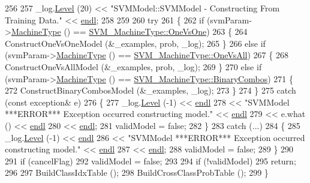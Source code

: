 \begin{DoxyCode}
256 
257   \_log.\hyperlink{class_k_k_b_1_1_run_log_a32cf761d7f2e747465fd80533fdbb659}{Level} (20) << \textcolor{stringliteral}{"SVMModel::SVMModel - Constructing From Training Data."} << 
      \hyperlink{namespace_k_k_b_ad1f50f65af6adc8fa9e6f62d007818a8}{endl};
258 
259 
260   \textcolor{keywordflow}{try}
261   \{
262     \textcolor{keywordflow}{if}  (svmParam->\hyperlink{class_k_k_m_l_l_1_1_s_v_mparam_a30153e00007f9cf65343e0ad97ad61fb}{MachineType} () == \hyperlink{namespace_k_k_m_l_l_ad917464bc631109a3021cf02cd27af9aa2cb1a8e8122853731a8eb99f1bd56630}{SVM\_MachineType::OneVsOne})
263     \{
264       ConstructOneVsOneModel (&\_examples, prob, \_log);
265     \}
266     \textcolor{keywordflow}{else} \textcolor{keywordflow}{if}  (svmParam->\hyperlink{class_k_k_m_l_l_1_1_s_v_mparam_a30153e00007f9cf65343e0ad97ad61fb}{MachineType} () == \hyperlink{namespace_k_k_m_l_l_ad917464bc631109a3021cf02cd27af9aa0bf7132f9ec5b2de535b831afd3ae75c}{SVM\_MachineType::OneVsAll})
267     \{
268       ConstructOneVsAllModel (&\_examples, prob, \_log);
269     \}
270     \textcolor{keywordflow}{else} \textcolor{keywordflow}{if}  (svmParam->\hyperlink{class_k_k_m_l_l_1_1_s_v_mparam_a30153e00007f9cf65343e0ad97ad61fb}{MachineType} () == 
      \hyperlink{namespace_k_k_m_l_l_ad917464bc631109a3021cf02cd27af9aa01ad67463554c5f5552dcc6b5f4a553f}{SVM\_MachineType::BinaryCombos})
271     \{
272       ConstructBinaryCombosModel (&\_examples, \_log);
273     \}
274   \}
275   \textcolor{keywordflow}{catch}  (\textcolor{keyword}{const} exception& e)
276   \{
277     \_log.\hyperlink{class_k_k_b_1_1_run_log_a32cf761d7f2e747465fd80533fdbb659}{Level} (-1) << \hyperlink{namespace_k_k_b_ad1f50f65af6adc8fa9e6f62d007818a8}{endl}
278       << \textcolor{stringliteral}{"SVMModel  ***ERROR***   Exception occurred constructing model."} << 
      \hyperlink{namespace_k_k_b_ad1f50f65af6adc8fa9e6f62d007818a8}{endl}
279       << e.what () << \hyperlink{namespace_k_k_b_ad1f50f65af6adc8fa9e6f62d007818a8}{endl}
280       << \hyperlink{namespace_k_k_b_ad1f50f65af6adc8fa9e6f62d007818a8}{endl};
281     validModel = \textcolor{keyword}{false};
282   \}
283   \textcolor{keywordflow}{catch}  (...)
284   \{
285     \_log.\hyperlink{class_k_k_b_1_1_run_log_a32cf761d7f2e747465fd80533fdbb659}{Level} (-1) << \hyperlink{namespace_k_k_b_ad1f50f65af6adc8fa9e6f62d007818a8}{endl}
286       << \textcolor{stringliteral}{"SVMModel  ***ERROR***   Exception occurred constructing model."} << 
      \hyperlink{namespace_k_k_b_ad1f50f65af6adc8fa9e6f62d007818a8}{endl}
287       << \hyperlink{namespace_k_k_b_ad1f50f65af6adc8fa9e6f62d007818a8}{endl};
288     validModel = \textcolor{keyword}{false};
289   \}
290 
291   \textcolor{keywordflow}{if}  (cancelFlag)
292     validModel = \textcolor{keyword}{false};
293 
294   \textcolor{keywordflow}{if}  (!validModel)
295     \textcolor{keywordflow}{return};
296 
297   BuildClassIdxTable ();
298   BuildCrossClassProbTable ();
299 \}
\end{DoxyCode}
